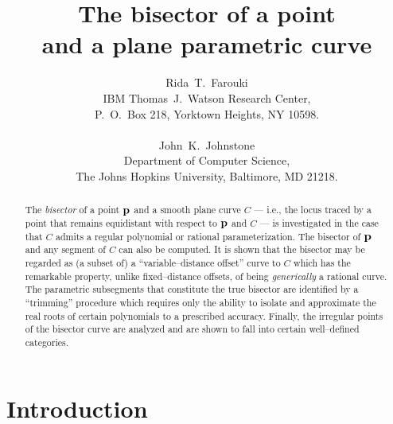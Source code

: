 \newcommand{\figg}[3]{\begin{figure}[htbp]\vspace{#3}\caption{#2}\label{#1}\end{figure}}



\title{
The bisector of a point \\
and a plane parametric curve
}

\author{
Rida~T.~Farouki \\
IBM Thomas~J.~Watson Research Center, \\
P.~O.~Box 218, Yorktown Heights, NY 10598. \\ \\
John~K.~Johnstone \\
Department of Computer Science, \\
The Johns Hopkins University, Baltimore, MD 21218.
}

\maketitle

\begin{abstract}
The {\it bisector\/} of a point ${\bf p}$ and a smooth plane curve
$C$ --- i.e., the locus traced by a point that remains equidistant
with respect to ${\bf p}$ and $C$ --- is investigated in the case
that $C$ admits a regular polynomial or rational parameterization.
The bisector of ${\bf p}$ and any segment of $C$ can also be computed.
It is shown that the bisector may be regarded as (a
subset of) a ``variable--distance offset'' curve to $C$ which has
the remarkable property, unlike fixed--distance offsets, of being
{\it generically\/} a rational curve. The parametric subsegments
that constitute the true bisector are identified by a ``trimming''
procedure which requires only the ability to isolate and approximate
the real roots of certain polynomials to a prescribed accuracy.
Finally, the irregular points of the bisector curve are analyzed
and are shown to fall into certain well--defined categories.
\end{abstract}

\thispagestyle{empty}\mbox{}\vfill\eject

\setcounter{page}{1}
\thispagestyle{plain}

\section{Introduction}
\label{intro}

